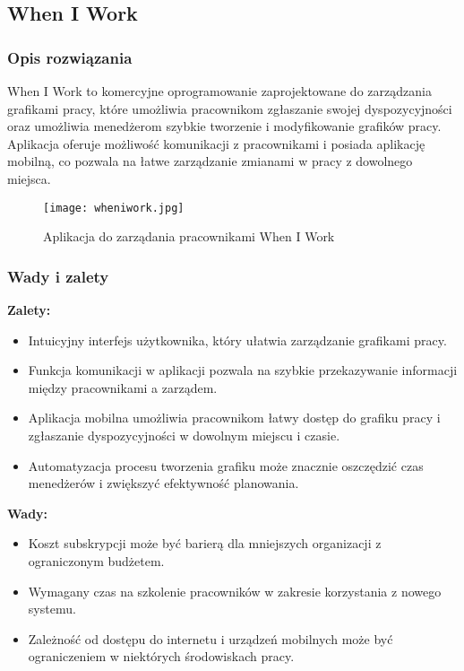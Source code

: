 \documentclass[shortabstract]{iithesis}
\begin{document}
\subsection{When I Work}

\subsubsection{Opis rozwiązania}
When I Work to komercyjne oprogramowanie zaprojektowane do zarządzania grafikami pracy, które umożliwia pracownikom zgłaszanie swojej dyspozycyjności oraz umożliwia menedżerom szybkie tworzenie i modyfikowanie grafików pracy. Aplikacja oferuje możliwość komunikacji z pracownikami i posiada aplikację mobilną, co pozwala na łatwe zarządzanie zmianami w pracy z dowolnego miejsca.
\begin{figure}[h]
    \centering
    \texttt{[image: wheniwork.jpg]}
    \caption{Aplikacja do zarządania pracownikami When I Work}
    \label{fig:wiw}
\end{figure}

\subsubsection{Wady i zalety}

\textbf{Zalety:}
\begin{itemize}
  \item Intuicyjny interfejs użytkownika, który ułatwia zarządzanie grafikami pracy.
  \item Funkcja komunikacji w aplikacji pozwala na szybkie przekazywanie informacji między pracownikami a zarządem.
  \item Aplikacja mobilna umożliwia pracownikom łatwy dostęp do grafiku pracy i zgłaszanie dyspozycyjności w dowolnym miejscu i czasie.
  \item Automatyzacja procesu tworzenia grafiku może znacznie oszczędzić czas menedżerów i zwiększyć efektywność planowania.
\end{itemize}

\textbf{Wady:}
\begin{itemize}
  \item Koszt subskrypcji może być barierą dla mniejszych organizacji z ograniczonym budżetem.
  \item Wymagany czas na szkolenie pracowników w zakresie korzystania z nowego systemu.
  \item Zależność od dostępu do internetu i urządzeń mobilnych może być ograniczeniem w niektórych środowiskach pracy.
\end{itemize}
\end{document}
